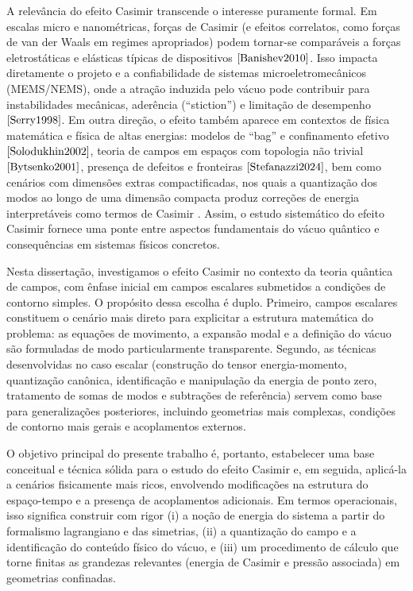A relevância do efeito Casimir transcende o interesse puramente formal. Em escalas micro e nanométricas, forças de Casimir (e efeitos correlatos, como forças de van der Waals em regimes apropriados) podem tornar-se comparáveis a forças eletrostáticas e elásticas típicas de dispositivos $\cite{Banishev2010}$. Isso impacta diretamente o projeto e a confiabilidade de sistemas microeletromecânicos (MEMS/NEMS), onde a atração induzida pelo vácuo pode contribuir para instabilidades mecânicas, aderência (“stiction”) e limitação de desempenho $\cite{Serry1998}$. Em outra direção, o efeito também aparece em contextos de física matemática e física de altas energias: modelos de “bag” e confinamento efetivo $\cite{Solodukhin2002}$, teoria de campos em espaços com topologia não trivial $\cite{Bytsenko2001}$, presença de defeitos e fronteiras $\cite{Stefanazzi2024}$, bem como cenários com dimensões extras compactificadas, nos quais a quantização dos modos ao longo de uma dimensão compacta produz correções de energia interpretáveis como termos de Casimir \cite{DalvitLamoreaux2021}. Assim, o estudo sistemático do efeito Casimir fornece uma ponte entre aspectos fundamentais do vácuo quântico e consequências em sistemas físicos concretos.

Nesta dissertação, investigamos o efeito Casimir no contexto da teoria quântica de campos, com ênfase inicial em campos escalares submetidos a condições de contorno simples. O propósito dessa escolha é duplo. Primeiro, campos escalares constituem o cenário mais direto para explicitar a estrutura matemática do problema: as equações de movimento, a expansão modal e a definição do vácuo são formuladas de modo particularmente transparente. Segundo, as técnicas desenvolvidas no caso escalar  (construção do tensor energia-momento, quantização canônica, identificação e manipulação da energia de ponto zero, tratamento de somas de modos e subtrações de referência) servem como base para generalizações posteriores, incluindo geometrias mais complexas, condições de contorno mais gerais e acoplamentos externos.

O objetivo principal do presente trabalho é, portanto, estabelecer uma base conceitual e técnica sólida para o estudo do efeito Casimir e, em seguida, aplicá-la a cenários fisicamente mais ricos, envolvendo modificações na estrutura do espaço-tempo e a presença de acoplamentos adicionais. Em termos operacionais, isso significa construir com rigor (i) a noção de energia do sistema a partir do formalismo lagrangiano e das simetrias, (ii) a quantização do campo e a identificação do conteúdo físico do vácuo, e (iii) um procedimento de cálculo que torne finitas as grandezas relevantes (energia de Casimir e pressão associada) em geometrias confinadas.

